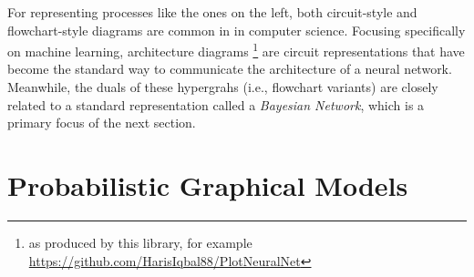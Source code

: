 {%
For representing processes like the ones on the left,
both circuit-style and flowchart-style diagrams are common in in computer science. 
Focusing specifically on machine learning, architecture diagrams%
    \footnote{as produced by this library, for example \url{https://github.com/HarisIqbal88/PlotNeuralNet}} 
are circuit representations that have become the standard way to communicate the architecture of a neural network.
%
Meanwhile, the duals of these hypergrahs (i.e., flowchart variants) are closely related to a standard representation called a \emph{Bayesian Network}, which is a primary focus of the next section. 
}%



%




\section{Probabilistic Graphical Models}
    \label{sec:prelim-pgms}

